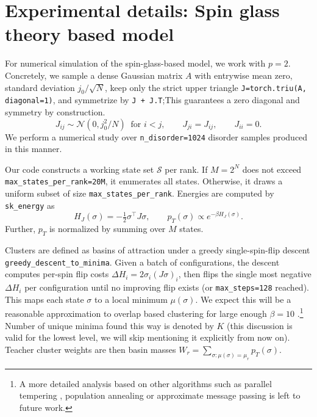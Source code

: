 \documentclass{article}
\theoremstyle{remark} %
\begin{document}
\section{Experimental details: Spin glass theory based model}\label{app_spin_glass}





For numerical simulation of the spin-glass-based model, we work with $p=2$. Concretely, we sample a dense Gaussian matrix $A$ with entrywise mean zero, standard deviation $j_0/\sqrt{N}$,
keep only the strict upper triangle \texttt{J=torch.triu(A, diagonal=1)}, and symmetrize by \texttt{J + J.T};This guarantees a zero diagonal and symmetry by construction.
\begin{equation}
J_{ij}\sim\mathcal{N}(0,j_0^2/N)\;\; \text{for }i<j,\qquad J_{ji}=J_{ij},\qquad J_{ii}=0.
\end{equation}
We perform a numerical study over \texttt{n\_disorder=1024} disorder samples produced in this manner.

Our code constructs a working state set $\mathcal{S}$ per rank.
If $M=2^N$ does not exceed \texttt{max\_states\_per\_rank=20M}, it enumerates all states.
Otherwise, it draws a uniform subset of size \texttt{max\_states\_per\_rank}.
Energies are computed by \texttt{sk\_energy} as
\begin{equation}
H_J(\sigma)=-\tfrac12\sigma^\top J\sigma,\qquad p_T(\sigma)\propto e^{-\beta H_J(\sigma)}.
\end{equation}
Further, $p_T$ is normalized by summing over $M$ states.

Clusters are defined as basins of attraction under a greedy single-spin-flip descent \texttt{greedy\_descent\_to\_minima}.
Given a batch of configurations, the descent computes per-spin flip costs $\Delta H_i=2\sigma_i (J\sigma)_i$, then flips the single most negative $\Delta H_i$
per configuration until no improving flip exists (or \texttt{max\_steps=128} reached).
This maps each state $\sigma$ to a local minimum $\mu(\sigma)$. We expect this will be a reasonable approximation to overlap based clustering for large enough $\beta=10$ \citep{zhou2011random}.\footnote{A more detailed analysis based on other algorithms such as parallel tempering \citep{hukushima1996exchange}, population annealing \citep{hukushima2003population} or  approximate message passing \citep{el2021optimization, alaoui2020algorithmic} is left to future work.}
Number of unique minima found this way is denoted by $K$ (this discussion is valid for the lowest level, we will skip mentioning it explicitly from now on). Teacher cluster weights are then basin masses $W_r=\sum_{\sigma:\mu(\sigma)=\mu_r}p_T(\sigma)$. 
\end{document}
